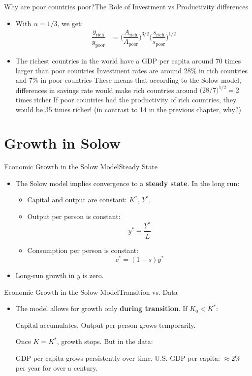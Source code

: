 \documentclass[10pt,aspectratio=169]{beamer}
\begin{document}
\begin{frame}{Why are poor countries poor?}{The Role of Investment vs Productivity differences}
\begin{itemize}
\item With $\alpha=1/3$, we get:
\begin{align*}
\dfrac{y_{\text{rich}}}{y_{\text{poor}}}&=\Bigg(\dfrac{A_{\text{rich}}}{A_{\text{poor}}}\Bigg)^{3/2} \Bigg(\dfrac{s_{\text{rich}}}{s_{\text{poor}}}\Bigg)^{1/2}
\end{align*}
\item The richest countries in the world have a GDP per capita around 70 times larger than poor countries
\itemvso Investment rates are around  28\% in rich countries and 7\% in poor countries 
\itemvso These means that according to the Solow model, differences in savings rate would make rich countries around $\Big( 28/7 \Big)^{1/2}=2$ times richer
\itemvso If poor countries had the productivity of rich countries, they would be 35 times richer! (in contrast to 14 in the previous chapter, why?)
\end{itemize}
\end{frame}

\section{Growth in Solow}
\begin{frame}{Economic Growth in the Solow Model}{Steady State}
\begin{itemize}
\item The Solow model implies convergence to a \textbf{steady state}.
\itemvso In the long run:
\begin{itemize}
    \item Capital and output are constant: $K^*,\, Y^*$.
    \item Output per person is constant:
    \[
    y^* \equiv \frac{Y^*}{\bar{L}}
    \]
    \item Consumption per person is constant:
    \[
    c^* = (1 - s)y^*
    \]
\end{itemize}
\item Long-run growth in $y$ is zero.
\end{itemize}
\end{frame}

\begin{frame}{Economic Growth in the Solow Model}{Transition vs. Data}
\begin{itemize}
\item The model allows for growth only \textbf{during transition}.
\itemvso If $K_0 < K^*$:
\begin{itemize}
    \itemvso Capital accumulates.
    \itemvso Output per person grows temporarily.
\end{itemize}
\itemvso Once $K = K^*$, growth stops.
\itemvso But in the data:
\begin{itemize}
    \itemvso GDP per capita grows persistently over time.
    \itemvso U.S. GDP per capita: $\approx 2\%$ per year for over a century.
\end{itemize}
\end{itemize}
\end{frame}
\end{document}
